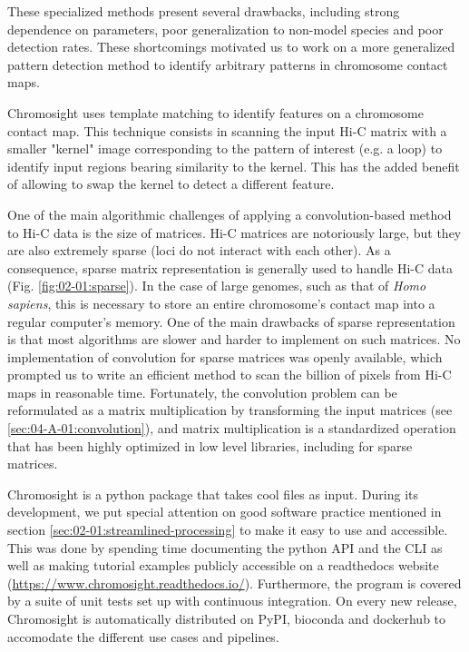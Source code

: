 These specialized methods present several drawbacks, including strong dependence on parameters, poor generalization to non-model species and poor detection rates. These shortcomings motivated us to work on a more generalized pattern detection method to identify arbitrary patterns in chromosome contact maps.

Chromosight uses template matching to identify features on a chromosome contact map. This technique consists in scanning the input Hi-C matrix with a smaller "kernel" image corresponding to the pattern of interest (e.g. a loop) to identify input regions bearing similarity to the kernel. This has the added benefit of allowing to swap the kernel to detect a different feature.

One of the main algorithmic challenges of applying a convolution-based method to Hi-C data is the size of matrices. Hi-C matrices are notoriously large, but they are also extremely sparse (loci do not interact with each other). As a consequence, sparse matrix representation is generally used to handle Hi-C data (Fig. \ref{fig:02-01:sparse}). In the case of large genomes, such as that of \textit{Homo sapiens}, this is necessary to store an entire chromosome's contact map into a regular computer's memory. One of the main drawbacks of sparse representation is that most algorithms are slower and harder to implement on such matrices. No implementation of convolution for sparse matrices was openly available, which prompted us to write an efficient method to scan the billion of pixels from Hi-C maps in reasonable time. Fortunately, the convolution problem can be reformulated as a matrix multiplication by transforming the input matrices (see \ref{sec:04-A-01:convolution}), and matrix multiplication is a standardized operation that has been highly optimized in low level libraries, including for sparse matrices.

Chromosight is a python package that takes cool files as input. During its development, we put special attention on good software practice mentioned in section \ref{sec:02-01:streamlined-processing} to make it easy to use and accessible. This was done by spending time documenting the python \acrshort{API} and the \acrshort{CLI} as well as making tutorial examples publicly accessible on a readthedocs website (\url{https://www.chromosight.readthedocs.io/}). Furthermore, the program is covered by a suite of unit tests set up with continuous integration. On every new release, Chromosight is automatically distributed on PyPI, bioconda and dockerhub to accomodate the different use cases and pipelines.

